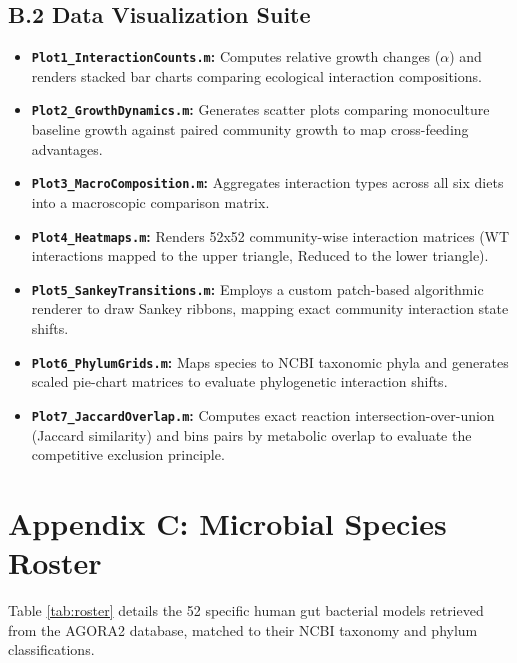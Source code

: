 \documentclass[11pt, a4paper]{article}
\begin{document}
\subsection{B.2 Data Visualization Suite}
\begin{itemize}[itemsep=4pt, parsep=0pt]
    \item \textbf{\texttt{Plot1\_InteractionCounts.m}:} Computes relative growth changes ($\alpha$) and renders stacked bar charts comparing ecological interaction compositions.
    \item \textbf{\texttt{Plot2\_GrowthDynamics.m}:} Generates scatter plots comparing monoculture baseline growth against paired community growth to map cross-feeding advantages.
    \item \textbf{\texttt{Plot3\_MacroComposition.m}:} Aggregates interaction types across all six diets into a macroscopic comparison matrix.
    \item \textbf{\texttt{Plot4\_Heatmaps.m}:} Renders 52x52 community-wise interaction matrices (WT interactions mapped to the upper triangle, Reduced to the lower triangle).
    \item \textbf{\texttt{Plot5\_SankeyTransitions.m}:} Employs a custom patch-based algorithmic renderer to draw Sankey ribbons, mapping exact community interaction state shifts.
    \item \textbf{\texttt{Plot6\_PhylumGrids.m}:} Maps species to NCBI taxonomic phyla and generates scaled pie-chart matrices to evaluate phylogenetic interaction shifts.
    \item \textbf{\texttt{Plot7\_JaccardOverlap.m}:} Computes exact reaction intersection-over-union (Jaccard similarity) and bins pairs by metabolic overlap to evaluate the competitive exclusion principle.
\end{itemize}

\newpage
\section{Appendix C: Microbial Species Roster}
Table \ref{tab:roster} details the 52 specific human gut bacterial models retrieved from the AGORA2 database, matched to their NCBI taxonomy and phylum classifications.
\end{document}
